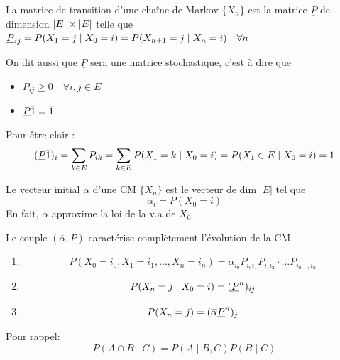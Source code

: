 \begin{definition}
    La matrice de transition d'une chaîne de Markov $\{X_n\}$ est la matrice $\underline P$ de dimension $\left| E \right|\times\left| E \right|$ telle que $\underline{P}_{ij} = P(X_1 = j\mid X_0 = i) = P(X_{n+1} = j\mid X_n = i)\quad \forall n$
\end{definition}

On dit aussi que $\underline P$ sera une matrice stochastique, c'est à dire que 
\begin{itemize}
    \item $P_{ij}\geq 0 \quad \forall i,j \in E$
    \item $\underline{P}\overline{1}= \overline{ 1}$
\end{itemize}
Pour être clair :
$$(\underline{P}\overline{1})_i= \sum_{k \in E}P_{ik}= \sum _{k\in E}P(X_1= k\mid X_0= i)= P(X_1\in E\mid X_0= i)= 1$$

\begin{definition}
    Le vecteur initial $\overline{\alpha}$ d'une CM $\{X_n\}$ est le vecteur de dim $|E|$ tel que $$\alpha_i= P(X_0= i)$$
    En fait, $\overline{\alpha}$ approxime la loi de la v.a de $X_0$ 
\end{definition}
\begin{proposition}
     Le couple $(\overline{\alpha},P)$ caractérise complètement l'évolution de la CM.
    \begin{enumerate}
        \item $$P(X_0 = i_0, X_1 = i_1,\dotsc, X_n = i_n) = \alpha_{i_0}P_{i_0i_1}P_{i_1i_2}\cdot\dots P_{i_{n-1}i_n}$$
        \item $$P(X_n= j\mid X_0= i)= (\underline{P}^n)_{ij}$$
        \item $$P(X_n= j)= (\overline{\alpha}\underline{P}^n)_j$$
    \end{enumerate}
\end{proposition}

Pour rappel: 
$$P(A\cap B \mid C)= P(A\mid B,C)P(B\mid C)$$

